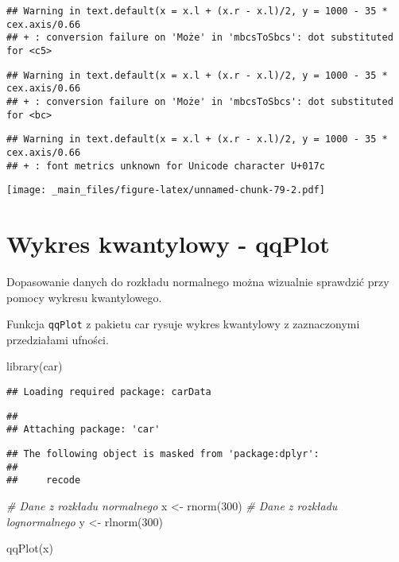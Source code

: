 \documentclass[
]{book}
\newenvironment{Shaded}{\begin{snugshade}}{\end{snugshade}}
\newcommand{\CommentTok}[1]{\textcolor[rgb]{0.56,0.35,0.01}{\textit{#1}}}
\newcommand{\DecValTok}[1]{\textcolor[rgb]{0.00,0.00,0.81}{#1}}
\newcommand{\FunctionTok}[1]{\textcolor[rgb]{0.00,0.00,0.00}{#1}}
\newcommand{\NormalTok}[1]{#1}
\newcommand{\OtherTok}[1]{\textcolor[rgb]{0.56,0.35,0.01}{#1}}
\begin{document}
\begin{verbatim}
## Warning in text.default(x = x.l + (x.r - x.l)/2, y = 1000 - 35 * cex.axis/0.66
## + : conversion failure on 'Może' in 'mbcsToSbcs': dot substituted for <c5>
\end{verbatim}

\begin{verbatim}
## Warning in text.default(x = x.l + (x.r - x.l)/2, y = 1000 - 35 * cex.axis/0.66
## + : conversion failure on 'Może' in 'mbcsToSbcs': dot substituted for <bc>
\end{verbatim}

\begin{verbatim}
## Warning in text.default(x = x.l + (x.r - x.l)/2, y = 1000 - 35 * cex.axis/0.66
## + : font metrics unknown for Unicode character U+017c
\end{verbatim}

\texttt{[image: \_main\_files/figure-latex/unnamed-chunk-79-2.pdf]}

\hypertarget{wykres-kwantylowy---qqplot}{%
\section{Wykres kwantylowy - qqPlot}\label{wykres-kwantylowy---qqplot}}

Dopasowanie danych do rozkładu normalnego można wizualnie sprawdzić przy pomocy wykresu kwantylowego.

Funkcja \texttt{qqPlot} z pakietu car rysuje wykres kwantylowy z zaznaczonymi przedziałami ufności.

\begin{Shaded}
\begin{Highlighting}[]
\FunctionTok{library}\NormalTok{(car)}
\end{Highlighting}
\end{Shaded}

\begin{verbatim}
## Loading required package: carData
\end{verbatim}

\begin{verbatim}
## 
## Attaching package: 'car'
\end{verbatim}

\begin{verbatim}
## The following object is masked from 'package:dplyr':
## 
##     recode
\end{verbatim}

\begin{Shaded}
\begin{Highlighting}[]
\CommentTok{\# Dane z rozkładu normalnego}
\NormalTok{x }\OtherTok{\textless{}{-}} \FunctionTok{rnorm}\NormalTok{(}\DecValTok{300}\NormalTok{)}
\CommentTok{\# Dane z rozkładu lognormalnego}
\NormalTok{y }\OtherTok{\textless{}{-}} \FunctionTok{rlnorm}\NormalTok{(}\DecValTok{300}\NormalTok{)}

\FunctionTok{qqPlot}\NormalTok{(x)}
\end{Highlighting}
\end{Shaded}
\end{document}
